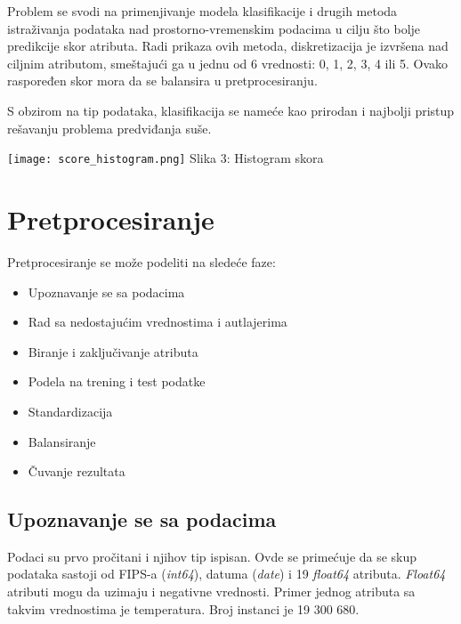 \documentclass[a4paper]{article}
\begin{document}
{\begin{minipage}{0.6\textwidth}
Problem se svodi na primenjivanje modela klasifikacije i drugih metoda istraživanja podataka nad prostorno-vremenskim podacima u cilju što bolje predikcije skor atributa. Radi prikaza ovih metoda, diskretizacija je izvršena nad ciljnim atributom, smeštajući ga u jednu od 6 vrednosti: 0, 1, 2, 3, 4 ili 5. Ovako raspoređen skor mora da se balansira u pretprocesiranju.

S obzirom na tip podataka, klasifikacija se nameće kao prirodan i najbolji pristup rešavanju problema predviđanja suše.
\end{minipage}
\begin{minipage}{0.05\textwidth}
\hphantom{a}
\end{minipage}
\begin{minipage}{0.5\textwidth}
\texttt{[image: score\_histogram.png]}
\hphantom{aaaaaaaaa}Slika 3: Histogram skora\\
\end{minipage}

\section{Pretprocesiranje}

Pretprocesiranje se može podeliti na sledeće faze:
\begin{itemize}
\item Upoznavanje se sa podacima
\item Rad sa nedostajućim vrednostima i autlajerima
\item Biranje i zaključivanje atributa
\item Podela na trening i test podatke
\item Standardizacija
\item Balansiranje
\item Čuvanje rezultata
\end{itemize} 

\subsection{Upoznavanje se sa podacima}
\label{upoznavanje_se_sa_podacima}

Podaci su prvo pročitani i njihov tip ispisan. Ovde se primećuje da se skup podataka sastoji od FIPS-a ({\em int64}), datuma ({\em date}) i 19 {\em float64} atributa. {\em Float64} atributi mogu da uzimaju i negativne vrednosti. Primer jednog atributa sa takvim vrednostima je temperatura. Broj instanci je 19 300 680.\\

}
\end{document}
